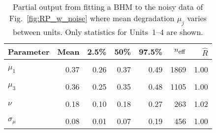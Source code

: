 \begin{table}
\centering
\caption{\label{tab:pp_mu}Partial output from fitting a BHM to the noisy data of Fig.~\ref{fig:RP_w_noise} where mean degradation $\mu_j$ varies between units. Only statistics for Units~1--4 are shown.}
\centering
\begin{tabular}[t]{lrrrrrr}
\toprule
Parameter & Mean & 2.5\% & 50\% & 97.5\% & $n_{\small{\mbox{eff}}}$ & $\hat{R}$\\
\midrule
\cellcolor{gray!10}{$\sigma$} & \cellcolor{gray!10}{0.03} & \cellcolor{gray!10}{0.02} & \cellcolor{gray!10}{0.03} & \cellcolor{gray!10}{0.04} & \cellcolor{gray!10}{846} & \cellcolor{gray!10}{1.01}\\
$\mu_1$ & 0.37 & 0.26 & 0.37 & 0.49 & 1869 & 1.00\\
\cellcolor{gray!10}{$\mu_2$} & \cellcolor{gray!10}{0.44} & \cellcolor{gray!10}{0.34} & \cellcolor{gray!10}{0.43} & \cellcolor{gray!10}{0.59} & \cellcolor{gray!10}{1646} & \cellcolor{gray!10}{1.00}\\
$\mu_3$ & 0.36 & 0.25 & 0.35 & 0.48 & 1105 & 1.00\\
\cellcolor{gray!10}{$\mu_4$} & \cellcolor{gray!10}{0.35} & \cellcolor{gray!10}{0.23} & \cellcolor{gray!10}{0.35} & \cellcolor{gray!10}{0.47} & \cellcolor{gray!10}{998} & \cellcolor{gray!10}{1.00}\\
\addlinespace
$\nu$ & 0.18 & 0.10 & 0.18 & 0.27 & 263 & 1.02\\
\cellcolor{gray!10}{$\mu_\mu$} & \cellcolor{gray!10}{0.40} & \cellcolor{gray!10}{0.33} & \cellcolor{gray!10}{0.40} & \cellcolor{gray!10}{0.51} & \cellcolor{gray!10}{1766} & \cellcolor{gray!10}{1.00}\\
$\sigma_\mu$ & 0.08 & 0.01 & 0.07 & 0.19 & 456 & 1.00\\
\bottomrule
\end{tabular}
\end{table}
